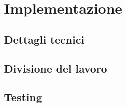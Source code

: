 \section{Implementazione}






\subsection{Dettagli tecnici} %





\subsection{Divisione del lavoro}
\subsection{Testing}